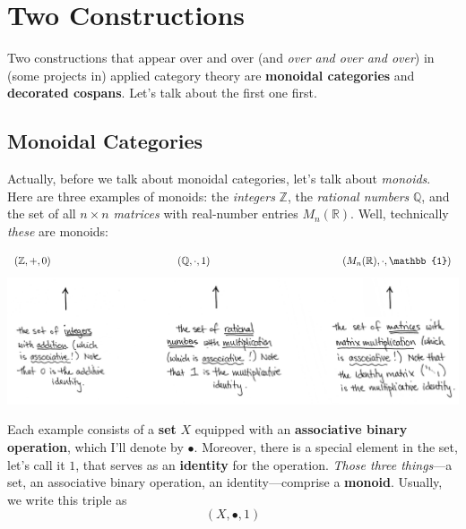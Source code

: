 \documentclass{tufte-handout-tai}
\theoremstyle{plain}
\theoremstyle{definition}
\theoremstyle{remark}
\begin{document}
\newpage
\section{Two Constructions}
Two constructions that appear over and over (and \textit{over and over and over}) in (some projects in) applied category theory are \textbf{monoidal categories} and \textbf{decorated cospans}. Let's talk about the first one first.



\subsection{Monoidal Categories}\label{sec:Monoidal}

Actually, before we talk about monoidal categories, let's talk about \textit{monoids}.
Here are three examples of monoids: the \textit{integers} $\mathbb{Z}$, the \textit{rational numbers} $\mathbb{Q}$, and the set of all $n\times n$ \textit{matrices} with real-number entries $ M_n(\mathbb{R})$. Well, technically \textit{these} are monoids:
\begin{fullwidth}
\[(\mathbb{Z},+,0) \hspace{4.4cm} (\mathbb{Q},\cdot,1) \hspace{4.6cm} (M_n(\mathbb{R}),\cdot,\mathbb{1})\]
\includegraphics{monoids.jpg}
\end{fullwidth}

Each example consists of a \textbf{set} $X$ equipped with an \textbf{associative binary operation}, which I'll denote by $\bullet$.
Moreover, there is a special element in the set, let's call it $1$, that serves as an \textbf{identity} for the  operation. \textit{Those three things}---a set, an associative binary operation, an identity---comprise a \textbf{monoid}. Usually, we write this triple as \[(X,\bullet,1)\]
\end{document}
